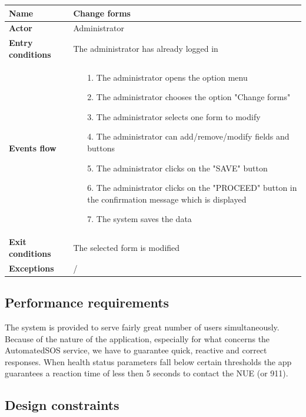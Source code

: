 \begin{table}[]
\begin{adjustbox}{width=\textwidth}
\footnotesize
\begin{tabular}{|p{}|p{}|}
\hline
\textbf{Name}             &  Change forms\\ \hline
\textbf{Actor}            &  Administrator\\ \hline
\textbf{Entry conditions} &  The administrator has already logged in\\ \hline
\textbf{Events flow}      &
	\begin{itemize}
		\item[1.] The administrator opens the option menu
		\item[2.] The administrator chooses the option "Change forms"
		\item[3.] The administrator selects one form to modify
		\item[4.] The administrator can add/remove/modify fields and buttons
		\item[5.] The administrator clicks on the "SAVE" button
		\item[6.] The administrator clicks on the "PROCEED" button in the confirmation message which is displayed
		\item[7.] The system saves the data
	\end{itemize}\\ \hline
\textbf{Exit conditions}  &  The selected form is modified\\ \hline
\textbf{Exceptions}       &  /\\ \hline
\end{tabular}
\end{adjustbox}
\end{table}

\clearpage

\subsection{Performance requirements}
The system is provided to serve fairly great number of users simultaneously. Because of the nature of the application, especially for what concerns the AutomatedSOS service, we have to guarantee quick, reactive and correct responses. When health status parameters fall below certain thresholds the app guarantees a reaction time of less then 5 seconds to contact the NUE (or 911).

\subsection{Design constraints}
